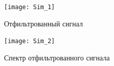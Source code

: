 \documentclass[10pt,a4paper]{article}
\begin{document}
                                                                                                                                                                                                                                                                                                                                                                                                                                                                                                                                                                                                                                                                                                                                                                                       \begin{figure}[h]\centering
    \texttt{[image: Sim\_1]} 
    \caption{Отфильтрованный сигнал}\label{fig.l6_Sim1}
\end{figure}

\begin{figure}\centering
	\texttt{[image: Sim\_2]}
	\caption{Спектр отфильтрованного сигнала}\label{fig.l6_Sim2}
\end{figure}                                                                                                                                                                                                                                                                                                                                                                                                                                                                                                                                                                                                                                                                                                                                                                                                                                                                                                                                                                                                                                                                                                                                                                                                                                                                                                                                                                                                                                                                        
\end{document}
